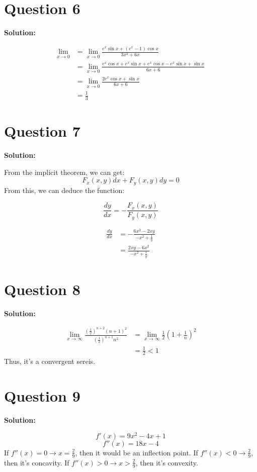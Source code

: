 \documentclass[11pt]{article} %
\begin{document}
\section{Question 6}
\textbf{Solution:}

\begin{align*}
	\lim\limits_{x\to 0} &= \lim\limits_{x\to 0} \frac{e^x \sin x +(e^x-1)\cos x}{3x^2+6x}\\
	&= \lim\limits_{x\to 0}\frac{e^x \cos x+e^x \sin x +e^x \cos x -e^x \sin x+\sin x}{6x+6}\\
	&=\lim\limits_{x\to 0} \frac{2e^x \cos x +\sin x}{6x+6}\\
	&=\frac{1}{3}
\end{align*}


\section{Question 7}
\textbf{Solution:}

From the implicit theorem, we can get: 
$$F_x(x,y)dx+F_y(x,y)dy=0$$
From this, we can deduce the function:

$$\frac{dy}{dx}=-\frac{F_x(x,y)}{F_y(x,y)}$$

\begin{align*}
	\frac{dy}{dx}&=-\frac{6x^2-2xy}{-x^2+\frac{1}{y}}\\
	&=\frac{2xy-6x^2}{-x^2+\frac{1}{y}}
\end{align*}

\section{Question 8}
\textbf{Solution:}

\begin{align*}
	\lim\limits_{x\to \infty}\frac{(\frac{1}{2})^{n+2}(n+1)^2}{(\frac{1}{2})^{n+1}n^2}&=
	\lim\limits_{x\to \infty} \frac{1}{2}(1+\frac{1}{n})^2\\
	&=\frac{1}{2}<1
\end{align*}
Thus, it's a convergent sereis. 

\section{Question 9}

\textbf{Solution:}

$$f'(x)=9x^2-4x+1$$
$$f''(x)=18x-4$$
If $f''(x)=0 \longrightarrow x=\frac{2}{9}$, then it would be an inflection point. If $f''(x)<0\longrightarrow \frac{2}{9}$, then it's concavity. If $f''(x)>0\longrightarrow x>\frac{2}{9}$, then it's convexity.
\end{document}
